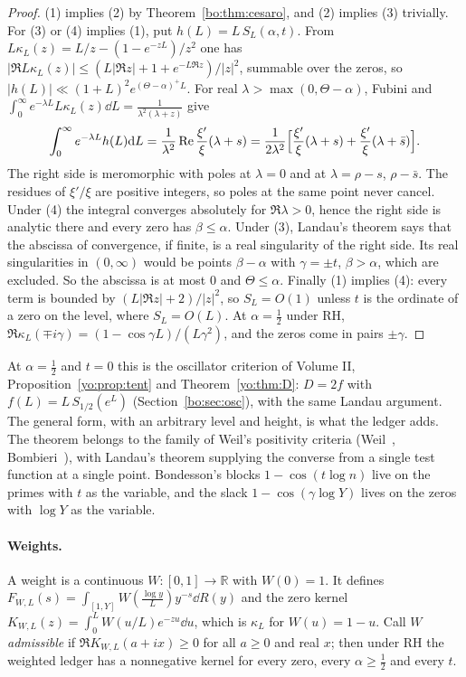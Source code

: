 \begin{proof}
(1) implies (2) by Theorem~\ref{bo:thm:cesaro}, and (2) implies (3) trivially. For (3) or (4) implies (1), put $h(L)=L\,S_L(\alpha,t)$. From $L\kappa_L(z)=L/z-(1-e^{-zL})/z^2$ one has $|\Re L\kappa_L(z)|\le(L|\Re z|+1+e^{-L\Re z})/|z|^2$, summable over the zeros, so $|h(L)|\ll(1+L)^2e^{(\Theta-\alpha)^+L}$. For real $\lambda>\max(0,\Theta-\alpha)$, Fubini and $\int_0^\infty e^{-\lambda L}L\kappa_L(z)\dd L=\frac1{\lambda^2(\lambda+z)}$ give
\[
\int_0^\infty e^{-\lambda L}h(L)\mathrm{d} L=\frac1{\lambda^2}\operatorname{Re}\frac{\xi'}{\xi}(\lambda+s)=\frac1{2\lambda^2}\Bigl[\frac{\xi'}{\xi}(\lambda+s)+\frac{\xi'}{\xi}(\lambda+\bar s)\Bigr].
\]
The right side is meromorphic with poles at $\lambda=0$ and at $\lambda=\rho-s$, $\rho-\bar s$. The residues of $\xi'/\xi$ are positive integers, so poles at the same point never cancel. Under (4) the integral converges absolutely for $\Re\lambda>0$, hence the right side is analytic there and every zero has $\beta\le\alpha$. Under (3), Landau's theorem says that the abscissa of convergence, if finite, is a real singularity of the right side. Its real singularities in $(0,\infty)$ would be points $\beta-\alpha$ with $\gamma=\pm t$, $\beta>\alpha$, which are excluded. So the abscissa is at most $0$ and $\Theta\le\alpha$. Finally (1) implies (4): every term is bounded by $(L|\Re z|+2)/|z|^2$, so $S_L=O(1)$ unless $t$ is the ordinate of a zero on the level, where $S_L=O(L)$. At $\alpha=\frac12$ under RH, $\Re\kappa_L(\mp i\gamma)=(1-\cos\gamma L)/(L\gamma^2)$, and the zeros come in pairs $\pm\gamma$.
\end{proof}

At $\alpha=\frac12$ and $t=0$ this is the oscillator criterion of Volume II, Proposition~\ref{yo:prop:tent} and Theorem~\ref{yo:thm:D}: $D=2f$ with $f(L)=L\,S_{1/2}(e^L)$ (Section~\ref{bo:sec:osc}), with the same Landau argument. The general form, with an arbitrary level and height, is what the ledger adds. The theorem belongs to the family of Weil's positivity criteria (Weil~\cite{Weil52}, Bombieri~\cite{Bombieri}), with Landau's theorem supplying the converse from a single test function at a single point. Bondesson's blocks $1-\cos(t\log n)$ live on the primes with $t$ as the variable, and the slack $1-\cos(\gamma\log Y)$ lives on the zeros with $\log Y$ as the variable.

\paragraph{Weights.} A weight is a continuous $W:[0,1]\to\mathbb R$ with $W(0)=1$. It defines $F_{W,L}(s)=\int_{[1,Y]}W(\frac{\log y}L)y^{-s}\dd R(y)$ and the zero kernel $K_{W,L}(z)=\int_0^LW(u/L)e^{-zu}\dd u$, which is $\kappa_L$ for $W(u)=1-u$. Call $W$ \emph{admissible} if $\Re K_{W,L}(a+ix)\ge0$ for all $a\ge0$ and real $x$; then under RH the weighted ledger has a nonnegative kernel for every zero, every $\alpha\ge\frac12$ and every $t$.


